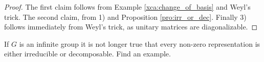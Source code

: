 \begin{proof}
	The first claim follows from Example \ref{xca:change_of_basis} and 
	Weyl's trick. The second claim, from 1) and
	Proposition \ref{pro:irr_or_dec}. Finally 3) follows immediately 
	from Weyl's trick, as unitary matrices are diagonalizable.  
\end{proof}


\begin{exercise}
    If $G$ is an infinite group it is not longer true that every non-zero representation
    is either irreducible or decomposable. Find an example.
\end{exercise}

